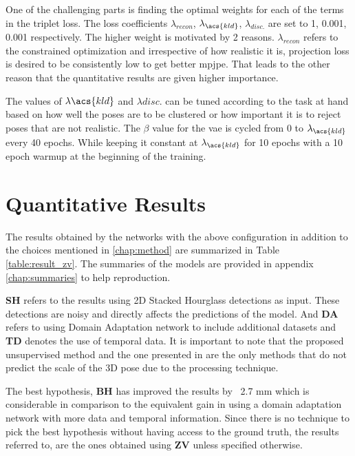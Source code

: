 One of the challenging parts is finding the optimal weights for each of the terms in the triplet loss. The loss coefficients $\lambda_{recon}$, $\lambda_{\acs{kld}}$, $\lambda_{disc.}$ are set to 1, 0.001, 0.001 respectively. The higher weight is motivated by 2 reasons. $\lambda_{recon}$ refers to the constrained optimization and irrespective of how realistic it is, projection loss is desired to be consistently low to get better \ac{mpjpe}. That leads to the other reason that the quantitative results are given higher importance.

The values of $\lambda{\acs{kld}}$ and $\lambda{disc.}$ can be tuned according to the task at hand based on how well the poses are to be clustered or how important it is to reject poses that are not realistic. The $\beta$ value for the \ac{vae} is cycled from 0 to $\lambda_{\acs{kld}}$ every 40 epochs. While keeping it constant at $\lambda_{\acs{kld}}$ for 10 epochs with a 10 epoch warmup at the beginning of the training.

\section{Quantitative Results}

The results obtained by the networks with the above configuration in addition to the choices mentioned in \ref{chap:method} are summarized in Table \ref{table:result_zv}. The summaries of the models are provided in appendix \ref{chap:summaries} to help reproduction.



\textbf{SH} refers to the results using 2D Stacked Hourglass detections as input. These detections are noisy and directly affects the predictions of the model. And \textbf{DA} refers to using Domain Adaptation network to include additional datasets and \textbf{TD} denotes the use of temporal data. It is important to note that the proposed unsupervised method and the one presented in \cite{amazon1} are the only methods that do not predict the scale of the 3D pose due to the processing technique.



The best hypothesis, \textbf{BH} has improved the results by ~2.7 mm which is considerable in comparison to the equivalent gain in \cite{amazon1} using a domain adaptation network with more data and temporal information. Since there is no technique to pick the best hypothesis without having access to the ground truth, the results referred to, are the ones obtained using \textbf{ZV} unless specified otherwise. 

